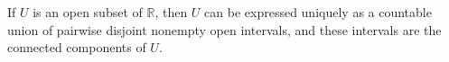 If $U$ is an open subset of $\mathbb{R}$, then $U$ can be expressed uniquely as a countable union of pairwise disjoint nonempty open intervals, and these intervals are the connected components of $U$.
